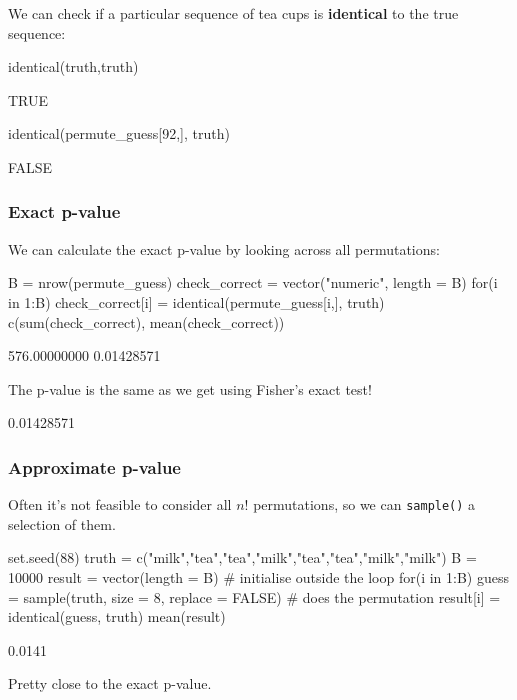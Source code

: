 \documentclass[a4paper]{article}\usepackage[]{graphicx}\usepackage[]{xcolor}
\begin{document}
	We can check if a particular sequence of tea cups is \textbf{identical} to the true sequence:
\begin{Schunk}
\begin{Sinput}
identical(truth,truth)
\end{Sinput}
\begin{Soutput}
[1] TRUE
\end{Soutput}
\begin{Sinput}
identical(permute_guess[92,], truth)
\end{Sinput}
\begin{Soutput}
[1] FALSE
\end{Soutput}
\end{Schunk}
\subsubsection{Exact p-value}
	We can calculate the exact p-value by looking across all permutations:
\begin{Schunk}
\begin{Sinput}
B = nrow(permute_guess)
check_correct = vector("numeric", length = B)
for(i in 1:B) {
  check_correct[i] = identical(permute_guess[i,], truth)
}
c(sum(check_correct), mean(check_correct))
\end{Sinput}
\begin{Soutput}
[1] 576.00000000   0.01428571
\end{Soutput}
\end{Schunk}
The p-value is the same as we get using Fisher's exact test!
\begin{Schunk}
\begin{Soutput}
[1] 0.01428571
\end{Soutput}
\end{Schunk}
\subsubsection{Approximate p-value}
Often it's not feasible to consider all \( n! \) permutations, so we can \lstinline|sample()| a selection of them.
\begin{Schunk}
\begin{Sinput}
set.seed(88)
truth = c("milk","tea","tea","milk","tea","tea","milk","milk")
B = 10000
result = vector(length = B) # initialise outside the loop
for(i in 1:B){
  guess = sample(truth, size = 8, replace = FALSE) # does the permutation
  result[i] = identical(guess, truth)
}
mean(result)
\end{Sinput}
\begin{Soutput}
[1] 0.0141
\end{Soutput}
\end{Schunk}
Pretty close to the exact p-value.
\end{document}
